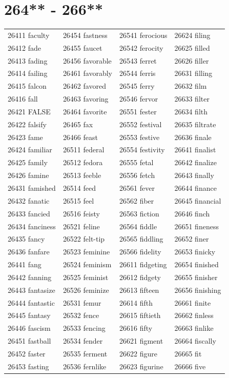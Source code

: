 \documentclass[10pt, oneside]{book}
\begin{document}
\begin{table}
	\centering
	\section*{264** - 266**}
	\begin{tabular}{l l l l}
26411 faculty &26454 fastness &26541 ferocious &26624 filing\\
26412 fade &26455 faucet &26542 ferocity &26625 filled\\
26413 fading &26456 favorable &26543 ferret &26626 filler\\
26414 failing &26461 favorably &26544 ferris &26631 filling\\
26415 falcon &26462 favored &26545 ferry &26632 film\\
26416 fall &26463 favoring &26546 fervor &26633 filter\\
26421 FALSE &26464 favorite &26551 fester &26634 filth\\
26422 falsify &26465 fax &26552 festival &26635 filtrate\\
26423 fame &26466 feast &26553 festive &26636 finale\\
26424 familiar &26511 federal &26554 festivity &26641 finalist\\
26425 family &26512 fedora &26555 fetal &26642 finalize\\
26426 famine &26513 feeble &26556 fetch &26643 finally\\
26431 famished &26514 feed &26561 fever &26644 finance\\
26432 fanatic &26515 feel &26562 fiber &26645 financial\\
26433 fancied &26516 feisty &26563 fiction &26646 finch\\
26434 fanciness &26521 feline &26564 fiddle &26651 fineness\\
26435 fancy &26522 felt-tip &26565 fiddling &26652 finer\\
26436 fanfare &26523 feminine &26566 fidelity &26653 finicky\\
26441 fang &26524 feminism &26611 fidgeting &26654 finished\\
26442 fanning &26525 feminist &26612 fidgety &26655 finisher\\
26443 fantasize &26526 feminize &26613 fifteen &26656 finishing\\
26444 fantastic &26531 femur &26614 fifth &26661 finite\\
26445 fantasy &26532 fence &26615 fiftieth &26662 finless\\
26446 fascism &26533 fencing &26616 fifty &26663 finlike\\
26451 fastball &26534 fender &26621 figment &26664 fiscally\\
26452 faster &26535 ferment &26622 figure &26665 fit\\
26453 fasting &26536 fernlike &26623 figurine &26666 five\\
	\end{tabular}
 \end{table}
\clearpage
\end{document}
